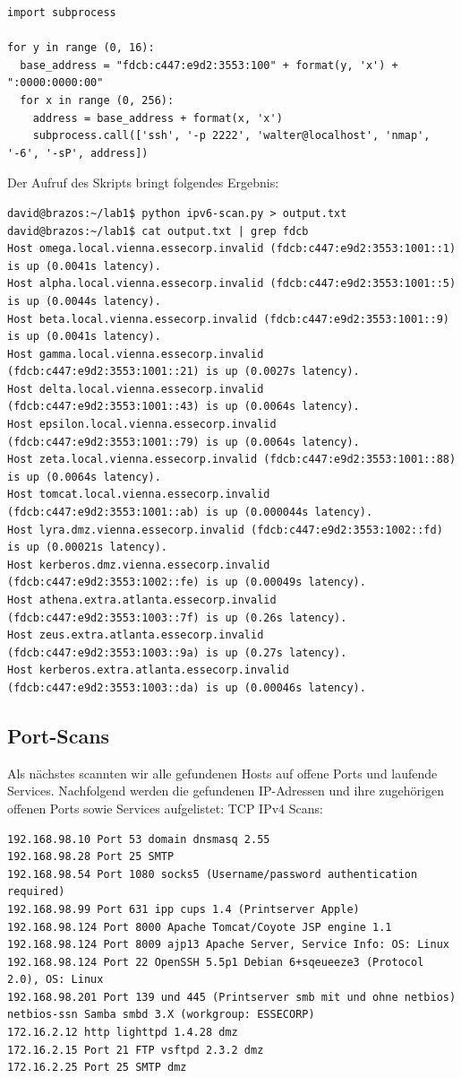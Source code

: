 \begin{lstlisting}
import subprocess

for y in range (0, 16):
  base_address = "fdcb:c447:e9d2:3553:100" + format(y, 'x') + ":0000:0000:00"
  for x in range (0, 256):
    address = base_address + format(x, 'x')
    subprocess.call(['ssh', '-p 2222', 'walter@localhost', 'nmap', '-6', '-sP', address])
\end{lstlisting}

Der Aufruf des Skripts bringt folgendes Ergebnis:

\begin{lstlisting}
david@brazos:~/lab1$ python ipv6-scan.py > output.txt
david@brazos:~/lab1$ cat output.txt | grep fdcb
Host omega.local.vienna.essecorp.invalid (fdcb:c447:e9d2:3553:1001::1) is up (0.0041s latency).
Host alpha.local.vienna.essecorp.invalid (fdcb:c447:e9d2:3553:1001::5) is up (0.0044s latency).
Host beta.local.vienna.essecorp.invalid (fdcb:c447:e9d2:3553:1001::9) is up (0.0041s latency).
Host gamma.local.vienna.essecorp.invalid (fdcb:c447:e9d2:3553:1001::21) is up (0.0027s latency).
Host delta.local.vienna.essecorp.invalid (fdcb:c447:e9d2:3553:1001::43) is up (0.0064s latency).
Host epsilon.local.vienna.essecorp.invalid (fdcb:c447:e9d2:3553:1001::79) is up (0.0064s latency).
Host zeta.local.vienna.essecorp.invalid (fdcb:c447:e9d2:3553:1001::88) is up (0.0064s latency).
Host tomcat.local.vienna.essecorp.invalid (fdcb:c447:e9d2:3553:1001::ab) is up (0.000044s latency).
Host lyra.dmz.vienna.essecorp.invalid (fdcb:c447:e9d2:3553:1002::fd) is up (0.00021s latency).
Host kerberos.dmz.vienna.essecorp.invalid (fdcb:c447:e9d2:3553:1002::fe) is up (0.00049s latency).
Host athena.extra.atlanta.essecorp.invalid (fdcb:c447:e9d2:3553:1003::7f) is up (0.26s latency).
Host zeus.extra.atlanta.essecorp.invalid (fdcb:c447:e9d2:3553:1003::9a) is up (0.27s latency).
Host kerberos.extra.atlanta.essecorp.invalid (fdcb:c447:e9d2:3553:1003::da) is up (0.00046s latency).
\end{lstlisting}

\subsection{Port-Scans}
Als nächstes scannten wir alle gefundenen Hosts auf offene Ports und laufende Services.
Nachfolgend werden die gefundenen IP-Adressen und ihre zugehörigen offenen Ports sowie Services aufgelistet:
TCP IPv4 Scans:
\begin{lstlisting}
192.168.98.10 Port 53 domain dnsmasq 2.55
192.168.98.28 Port 25 SMTP
192.168.98.54 Port 1080 socks5 (Username/password authentication required)
192.168.98.99 Port 631 ipp cups 1.4 (Printserver Apple)
192.168.98.124 Port 8000 Apache Tomcat/Coyote JSP engine 1.1
192.168.98.124 Port 8009 ajp13 Apache Server, Service Info: OS: Linux 
192.168.98.124 Port 22 OpenSSH 5.5p1 Debian 6+sqeueeze3 (Protocol 2.0), OS: Linux
192.168.98.201 Port 139 und 445 (Printserver smb mit und ohne netbios) netbios-ssn Samba smbd 3.X (workgroup: ESSECORP)
172.16.2.12 http lighttpd 1.4.28 dmz
172.16.2.15 Port 21 FTP vsftpd 2.3.2 dmz
172.16.2.25 Port 25 SMTP dmz
\end{lstlisting}

